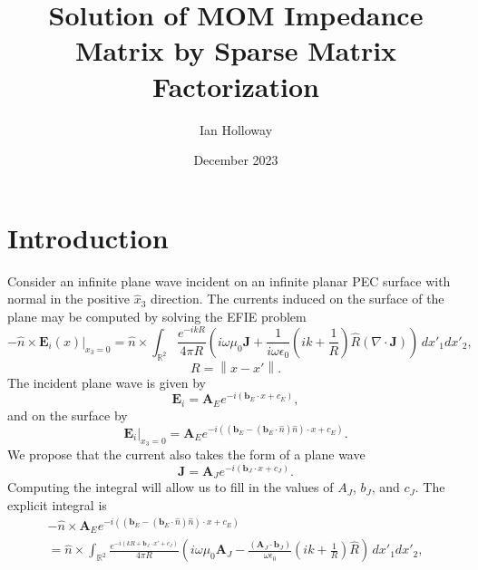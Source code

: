 \documentclass{article}
\title{Solution of MOM Impedance Matrix by Sparse Matrix Factorization}
\author{Ian Holloway}
\date{December 2023}
\newcommand{\norm}[1]{\left\lVert #1 \right\rVert}
\theoremstyle{plain}
\begin{document}
\maketitle

\section{Introduction}\label{sec_intro}

Consider an infinite plane wave incident on an infinite planar PEC surface with normal in the positive $\hat{x}_3$ direction.
The currents induced on the surface of the plane may be computed by solving the EFIE problem
\begin{equation}
	-\hat{n}\times\mathbf{E}_i(x)\rvert_{x_3=0} = \hat{n}\times\int_{\mathbb{R}^2} \frac{e^{-ikR}}{4\pi R}
	\left( i\omega\mu_0\mathbf{J} 
	+ \frac{1}{i\omega\epsilon_0}\left( ik + \frac{1}{R} \right) \hat{R} (\nabla\cdot\mathbf{J}) \right) \,dx'_1dx'_2,
\end{equation}
\begin{equation}
	R = \norm{x-x'}.
\end{equation}
The incident plane wave is given by
\begin{equation}
	\mathbf{E}_i = \mathbf{A}_Ee^{-i(\mathbf{b}_E\cdot x + c_E)},
\end{equation}
and on the surface by
\begin{equation}
	\mathbf{E}_i\lvert_{x_3=0} = \mathbf{A}_Ee^{-i\left( \left(\mathbf{b}_E - (\mathbf{b}_E\cdot\hat{n})\hat{n}\right)\cdot x + c_E \right)}.
\end{equation}
We propose that the current also takes the form of a plane wave
\begin{equation}
	\mathbf{J} = \mathbf{A}_Je^{-i(\mathbf{b}_J\cdot x + c_J)}.
\end{equation}
Computing the integral will allow us to fill in the values of $A_J$, $b_J$, and $c_J$.
The explicit integral is
\begin{multline}
	-\hat{n}\times\mathbf{A}_Ee^{-i\left( \left(\mathbf{b}_E - (\mathbf{b}_E\cdot\hat{n})\hat{n}\right)\cdot x + c_E \right)} \\
	= \hat{n}\times\int_{\mathbb{R}^2} \frac{e^{-i(kR+\mathbf{b}_J\cdot x' + c_J)}}{4\pi R}
	\left( i\omega\mu_0 \mathbf{A}_J
	- \frac{(\mathbf{A}_J\cdot\mathbf{b}_J)}{\omega\epsilon_0}\left( ik + \frac{1}{R} \right) \hat{R} \right) \,dx'_1dx'_2,
\end{multline}
\end{document}
